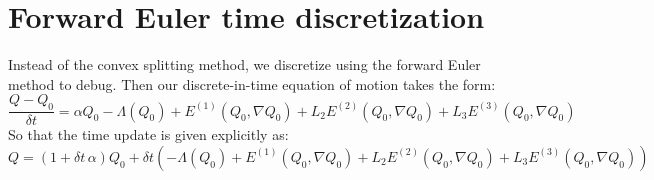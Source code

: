 \documentclass[reqno]{article}
\begin{document}
\section{Forward Euler time discretization}
Instead of the convex splitting method, we discretize using the forward Euler method to debug.
Then our discrete-in-time equation of motion takes the form:
\begin{equation}
    \frac{Q - Q_0}{\delta t}
    =
    \alpha Q_0
    - \Lambda(Q_0)
    + E^{(1)} (Q_0, \nabla Q_0)
    + L_2 E^{(2)} (Q_0, \nabla Q_0)
    + L_3 E^{(3)} (Q_0, \nabla Q_0)
\end{equation}
So that the time update is given explicitly as:
\begin{equation}
    Q
    =
    \left( 1 + \delta t \, \alpha \right) Q_0
    + \delta t \left(
        -\Lambda(Q_0)
        + E^{(1)} (Q_0, \nabla Q_0)
        + L_2 E^{(2)} (Q_0, \nabla Q_0)
        + L_3 E^{(3)} (Q_0, \nabla Q_0)
    \right)
\end{equation}
\end{document}
